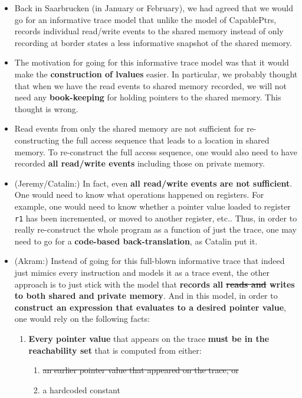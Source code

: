 \documentclass[12pt,a4paper]{article}
\begin{document}
\begin{itemize}
\item Back in Saarbrucken (in January or February),
 we had agreed that we would go for
an informative trace model that unlike the model of CapablePtrs,
records individual read/write events to the shared memory instead of
only recording at border states a less
informative snapshot of the shared memory.

\item The motivation for going for this informative trace model
was that it would make the \textbf{construction of lvalues}
easier. In particular, we probably thought that when we have
the read events to shared memory recorded, we will not need
any \textbf{book-keeping} for holding pointers to the shared memory.
This thought is wrong.

\item Read events from only the shared memory are not sufficient
for re-constructing the full access sequence that leads
to a location in shared memory.
To re-construct the full access sequence, one would also need
to have recorded \textbf{all read/write events} including those
on private memory.

\item (Jeremy/Catalin:)
In fact, even \textbf{all read/write events are not sufficient}.
One would need to know what operations happened on registers.
For example, one would need to know whether a pointer value
loaded to register \texttt{r1} has been incremented, or moved to 
another register, etc..
Thus, in order to really re-construct the whole program as
a function
of just the trace,
 one may need to go for a \textbf{code-based back-translation}, as
 Catalin put it.

\item (Akram:) Instead of going for this
full-blown informative trace that indeed just mimics every instruction
and models it as a trace event, the other approach is to 
just stick with the model that
\textbf{records all \st{reads and} writes to both shared and 
	private memory}.
And in this model, in order to
\textbf{construct an expression that evaluates
to a desired pointer value},
one would rely on the following facts:

\begin{enumerate}
\item \textbf{Every pointer value} that appears on the trace
\textbf{must be in the reachability set} that is computed from
either:
\begin{enumerate}
\item \st{an earlier pointer value that appeared on the trace, or}
\item a hardcoded constant
\end{enumerate}


\end{enumerate}
\end{itemize}
\end{document}
